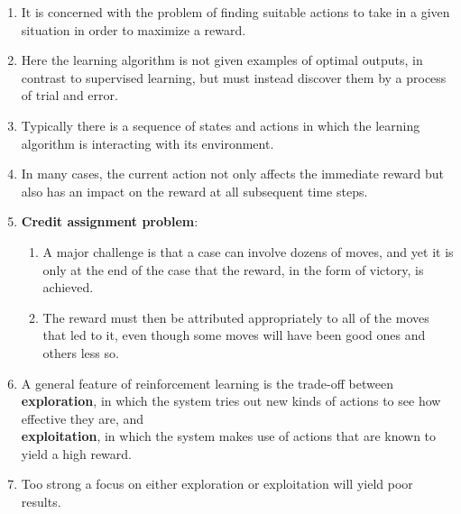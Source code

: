 \begin{enumerate}
    \item It is concerned with the problem of finding suitable actions to take in a given situation in order to maximize a reward.
    \hfill \cite{ml/book/Pattern-Recognition-And-Machine-Learning/Christopher-M-Bishop}

    \item Here the learning algorithm is not given examples of optimal outputs, in contrast to supervised learning, but must instead discover them by a process of trial and error.
    \hfill \cite{ml/book/Pattern-Recognition-And-Machine-Learning/Christopher-M-Bishop}

    \item Typically there is a sequence of states and actions in which the learning algorithm is interacting with its environment.
    \hfill \cite{ml/book/Pattern-Recognition-And-Machine-Learning/Christopher-M-Bishop}

    \item In many cases, the current action not only affects the immediate reward but also has an impact on the reward at all subsequent time steps.
    \hfill \cite{ml/book/Pattern-Recognition-And-Machine-Learning/Christopher-M-Bishop}

    \item \textbf{Credit assignment problem}:
    \hfill \cite{ml/book/Pattern-Recognition-And-Machine-Learning/Christopher-M-Bishop}
    \begin{enumerate}
        \item A major challenge is that a case can involve dozens of moves, and yet it is only at the end of the case that the reward, in the form of victory, is achieved.
        \hfill \cite{ml/book/Pattern-Recognition-And-Machine-Learning/Christopher-M-Bishop}

        \item The reward must then be attributed appropriately to all of the moves that led to it, even though some moves will have been good ones and others less so.
        \hfill \cite{ml/book/Pattern-Recognition-And-Machine-Learning/Christopher-M-Bishop}
    \end{enumerate}

    \item A general feature of reinforcement learning is the trade-off between \\
    \textbf{exploration}, in which the system tries out new kinds of actions to see how effective they are, and \\
    \textbf{exploitation}, in which the system makes use of actions that are known to yield a high reward.
    \hfill \cite{ml/book/Pattern-Recognition-And-Machine-Learning/Christopher-M-Bishop}

    \item Too strong a focus on either exploration or exploitation will yield poor results.
    \hfill \cite{ml/book/Pattern-Recognition-And-Machine-Learning/Christopher-M-Bishop}
\end{enumerate}









